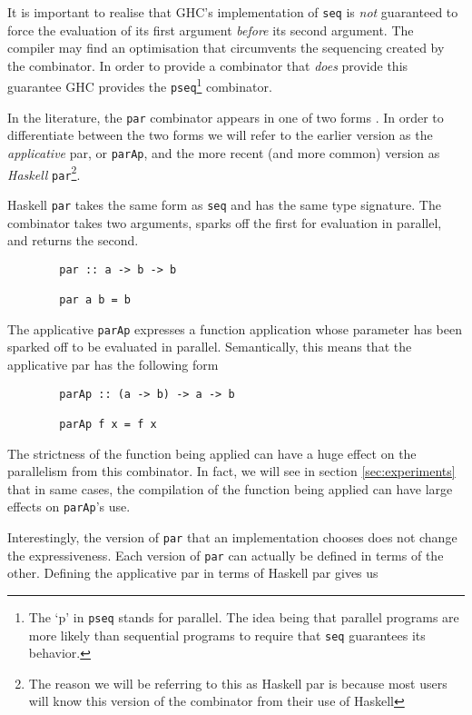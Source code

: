 It is important to realise that GHC's implementation of \verb=seq= is
\emph{not} guaranteed to force the evaluation of its first argument
\emph{before} its second argument. The compiler may find an optimisation that
circumvents the sequencing created by the combinator. In order to provide a
combinator that \emph{does} provide this guarantee GHC provides the
\verb-pseq-\footnote{The `p' in \texttt{pseq} stands for parallel.  The idea
being that parallel programs are more likely than sequential programs to
require that \texttt{seq} guarantees its behavior.} combinator.

In the literature, the \verb=par= combinator appears in one of two forms
\citep{HistoryOfHaskell, hughes:thesis}. In order to differentiate between the
two forms we will refer to the earlier version as the \emph{applicative} par, or
\verb=parAp=, and the more recent (and more common) version as \emph{Haskell}
\verb=par=\footnote{The reason we will be referring to this as Haskell par is
because most users will know this version of the combinator from their use of
Haskell}.

Haskell \verb=par= takes the same form as \verb=seq= and has the same type
signature. The combinator takes two arguments, sparks off the first for
evaluation in parallel, and returns the second.

\begin{verbatim}
        par :: a -> b -> b

        par a b = b
\end{verbatim}

The applicative \verb|parAp| expresses a function application whose parameter has been
sparked off to be evaluated in parallel. Semantically, this means that the
applicative par has the following form

\begin{verbatim}
        parAp :: (a -> b) -> a -> b

        parAp f x = f x
\end{verbatim}

The strictness of the function being applied can have a huge effect on the
parallelism from this combinator. In fact, we will see in section
\ref{sec:experiments} that in same cases, the compilation of the
function being applied can have large effects on \verb=parAp='s use.

Interestingly, the version of \verb=par= that an implementation chooses does
not change the expressiveness. Each version of \verb-par- can actually be
defined in terms of the other. Defining the applicative par in terms of Haskell
par gives us

